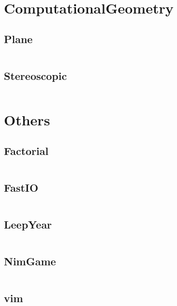 \documentclass[a4paper,11pt]{article}
\begin{document}
\newpage
\section{ComputationalGeometry}
\subsection{Plane}
\inputminted[breaklines]{c++}{06++ComputationalGeometry/+Plane.cpp}
\subsection{Stereoscopic}
\inputminted[breaklines]{c++}{06++ComputationalGeometry/+Stereoscopic.cpp}

\newpage
\section{Others}
\subsection{Factorial}
\inputminted[breaklines]{c++}{07++Others/+Factorial.cpp}
\subsection{FastIO}
\inputminted[breaklines]{c++}{07++Others/+FastIO.cpp}
\subsection{LeepYear}
\inputminted[breaklines]{c++}{07++Others/+LeepYear.cpp}
\subsection{NimGame}
\inputminted[breaklines]{c++}{07++Others/+NimGame.cpp}
\subsection{vim}
\inputminted[breaklines]{c++}{07++Others/+vim.vim}

\newpage
\end{document}
